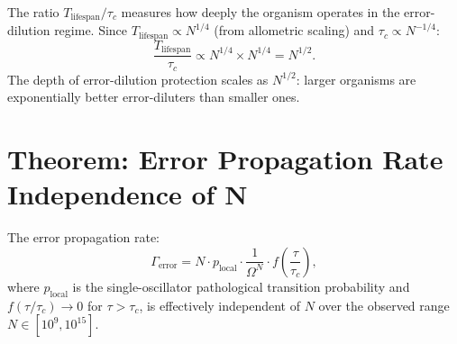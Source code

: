 \begin{corollary}
\label{cor:dilution_depth}
The ratio $T_{\mathrm{lifespan}} / \tau_c$ measures how deeply the organism
operates in the error-dilution regime. Since $T_{\mathrm{lifespan}} \propto N^{1/4}$
(from allometric scaling) and $\tau_c \propto N^{-1/4}$:
\begin{equation}
  \frac{T_{\mathrm{lifespan}}}{\tau_c} \propto N^{1/4} \times N^{1/4} = N^{1/2}.
\end{equation}
The depth of error-dilution protection scales as $N^{1/2}$: larger organisms
are exponentially better error-diluters than smaller ones.
\end{corollary}

\section{Theorem: Error Propagation Rate Independence of N}
\label{sec:error_propagation}

\begin{theorem}
\label{thm:error_propagation}
The error propagation rate:
\begin{equation}
  \Gamma_{\mathrm{error}} = N \cdot p_{\mathrm{local}} \cdot \frac{1}{\Omega^N}
  \cdot f\!\left(\frac{\tau}{\tau_c}\right),
  \label{eq:error_propagation_rate}
\end{equation}
where $p_{\mathrm{local}}$ is the single-oscillator pathological transition
probability and $f(\tau/\tau_c) \to 0$ for $\tau > \tau_c$, is effectively
independent of $N$ over the observed range $N \in [10^9, 10^{15}]$.
\end{theorem}

